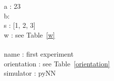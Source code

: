 \hspace*{0.0cm} a : 23\\ 
\hspace*{0.0cm} b: \\ 
\hspace*{1.5cm} s : [1, 2, 3]\\ 
\hspace*{1.5cm} w : see Table~\ref{w} \\ 
\hspace*{0.0cm} \\ 
\hspace*{0.0cm} name : first experiment\\ 
\hspace*{0.0cm} orientation : see Table~\ref{orientation} \\ 
\hspace*{0.0cm} simulator : pyNN